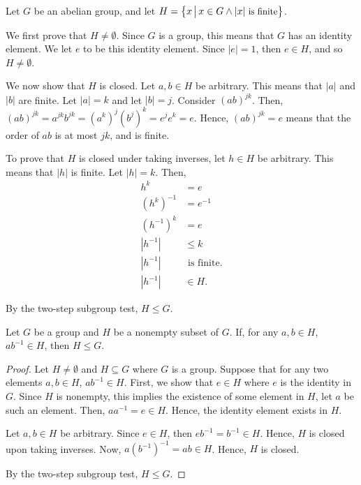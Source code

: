     \begin{example}
        Let \(G\) be an abelian group, and let \(H = \big\{x \,\big|\, x\in G\land |x|\text{\small{} is finite}\big\}\).

        We first prove that \(H \neq \emptyset\). Since \(G\) is a group, this means that \(G\) has an identity element. We let \(e\) to be this identity element. Since \(|e| = 1\), then  \(e\in H\), and so \(H \neq \emptyset\).

        We now show that \(H\) is closed. Let \(a, b\in H\) be arbitrary. This means that \(|a|\) and \(|b|\) are finite. Let \(|a| = k\) and let \(|b| = j\). Consider \((ab)^{jk}\). Then, \((ab)^{jk} = a^{jk}b^{jk} = (a^k)^j (b^j)^k = e^j e^k = e\). Hence, \((ab)^{jk} = e\) means that the order of \(ab\) is at most \(jk\), and is finite. 

        To prove that \(H\) is closed under taking inverses, let \(h\in H\) be arbitrary. This means that \(|h|\) is finite. Let \(|h| = k\). Then,
        \begin{align*}
            h^k &= e \\
            (h^k)^{-1} &= e^{-1} \\
            (h^{-1})^{k} &= e \\
            |h^{-1}| &\leq k \\
            |h^{-1}| &\text{ is finite.} \\
            |h^{-1}| &\in H.
        \end{align*}

        By the two-step subgroup test, \(H \leq G\).
    \end{example}

    \begin{thm}
        Let \(G\) be a group and \(H\) be a nonempty subset of \(G\). If, for any \(a,b\in H\), \(ab^{-1}\in H\), then \(H \leq G\).
    \end{thm}

    \begin{proof}
        Let \(H \neq \emptyset\) and \(H \subseteq G\) where \(G\) is a group. Suppose that for any two elements \(a, b\in H\), \(ab^{-1}\in H\). First, we show that \(e\in H\) where \(e\) is the identity in \(G\). Since \(H\) is nonempty, this implies the existence of some element in \(H\), let \(a\) be such an element. Then, \(aa^{-1} = e \in H\). Hence, the identity element exists in \(H\).

        Let \(a,b\in H\) be arbitrary. Since \(e\in H\), then \(eb^{-1} = b^{-1}\in H\). Hence, \(H\) is closed upon taking inverses. Now, \(a(b^{-1})^{-1} = ab\in H\). Hence, \(H\) is closed.

        By the two-step subgroup test, \(H \leq G\).
    \end{proof}
